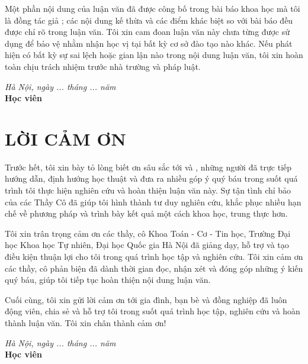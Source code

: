 Một phần nội dung của luận văn đã được công bố trong bài báo khoa học mà tôi là đồng tác giả \cite{tran2026dynamic}; các nội dung kế thừa và các điểm khác biệt so với bài báo đều được chỉ rõ trong luận văn. Tôi xin cam đoan luận văn này chưa từng được sử dụng để bảo vệ nhằm nhận học vị tại bất kỳ cơ sở đào tạo nào khác. Nếu phát hiện có bất kỳ sự sai lệch hoặc gian lận nào trong nội dung luận văn, tôi xin hoàn toàn chịu trách nhiệm trước nhà trường và pháp luật.

\vspace{1cm}
\begin{flushright}
\begin{minipage}{7cm}\centering
\textit{Hà Nội, ngày ... tháng ... năm \nam}\\
\textbf{Học viên}\\[2.6cm]
\textbf{\tacgiathuong}
\end{minipage}
\end{flushright}

\chapter*{LỜI CẢM ƠN}
Trước hết, tôi xin bày tỏ lòng biết ơn sâu sắc tới \huongdanmot{} và \huongdanhai, những người đã trực tiếp hướng dẫn, định hướng học thuật và đưa ra nhiều góp ý quý báu trong suốt quá trình tôi thực hiện nghiên cứu và hoàn thiện luận văn này. Sự tận tình chỉ bảo của các Thầy Cô đã giúp tôi hình thành tư duy nghiên cứu, khắc phục nhiều hạn chế về phương pháp và trình bày kết quả một cách khoa học, trung thực hơn.

Tôi xin trân trọng cảm ơn các thầy, cô Khoa Toán - Cơ - Tin học, Trường Đại học Khoa học Tự nhiên, Đại học Quốc gia Hà Nội đã giảng dạy, hỗ trợ và tạo điều kiện thuận lợi cho tôi trong quá trình học tập và nghiên cứu. Tôi xin cảm ơn các thầy, cô phản biện đã dành thời gian đọc, nhận xét và đóng góp những ý kiến quý báu, giúp tôi tiếp tục hoàn thiện nội dung luận văn.

Cuối cùng, tôi xin gửi lời cảm ơn tới gia đình, bạn bè và đồng nghiệp đã luôn động viên, chia sẻ và hỗ trợ tôi trong suốt quá trình học tập, nghiên cứu và hoàn thành luận văn. Tôi xin chân thành cảm ơn!

\vspace{1cm}
\begin{flushright}
\begin{minipage}{7cm}\centering
\textit{Hà Nội, ngày ... tháng ... năm \nam}\\
\textbf{Học viên}\\[2.6cm]
\textbf{\tacgiathuong}
\end{minipage}
\end{flushright}

